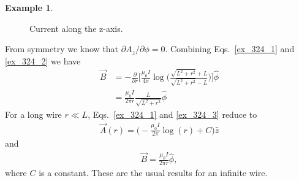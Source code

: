 \documentclass[11pt,a4paper,oneside]{book}
\numberwithin{equation}{section}
\theoremstyle{it}
\theoremstyle{definition}
\newtheorem{example}{Example}[section]
\begin{document}
\begin{example}
\begin{figure}[H]
\captionsetup{width=0.75\textwidth}		
\caption{Current along the z-axis.}
\label{ex_324}
\end{figure}
From symmetry we know that $\partial A_z/\partial \phi = 0$. Combining Eqs.~\eqref{ex_324_1} and \ref{ex_324_2} we have
\begin{equation}\label{ex_324_3}
	\begin{aligned}
		\vec{B} &= -\frac{\partial}{\partial r}\Big[\frac{\mu_0I}{4\pi} \log\Big(\frac{\sqrt{L^2+r^2}+L}{\sqrt{L^2+r^2}-L}\Big)\Big]\hat{\phi} \\[6pt]
		&= \frac{\mu_0I}{2\pi r} \frac{L}{\sqrt{L^2+r^2}}\hat{\phi}
	\end{aligned}
\end{equation}
For a long wire $r\ll L$, Eqs.~\eqref{ex_324_1} and \ref{ex_324_3} reduce to
 \begin{equation}\label{ex_324_4}
 	\begin{aligned}
 		\vec{A}(r) = \Big(-\frac{\mu_0 I}{2\pi}\log(r)+C\Big)\hat{z}
 	\end{aligned}
 \end{equation}
and
 \begin{equation}\label{ex_324_5}
	\begin{aligned}
		\vec{B} = \frac{\mu_0 I}{2\pi r}\hat{\phi},
	\end{aligned}
\end{equation}
where $C$ is a constant. These are the usual results for an infinite wire.
\end{example}
\end{document}

